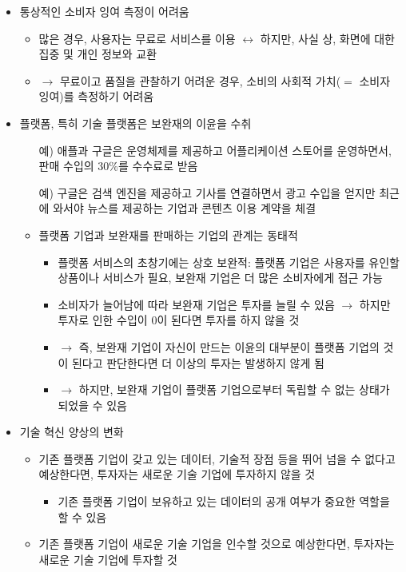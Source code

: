 \begin{itemize}
\item 통상적인 소비자 잉여 측정이 어려움
	\begin{itemize}
	\item 많은 경우, 사용자는 무료로 서비스를 이용 $\leftrightarrow$ 하지만, 사실 상, 화면에 대한 집중 및 개인 정보와 교환
	\item $\rightarrow$ 무료이고 품질을 관찰하기 어려운 경우, 소비의 사회적 가치($=$ 소비자 잉여)를 측정하기 어려움
	\end{itemize}
\item 플랫폼, 특히 기술 플랫폼은 보완재의 이윤을 수취
	\begin{itemize}
	\item[예)] 애플과 구글은 운영체제를 제공하고 어플리케이션 스토어를 운영하면서, 판매 수입의 30\%를 수수료로 받음
	\item[예)] 구글은 검색 엔진을 제공하고 기사를 연결하면서 광고 수입을 얻지만 최근에 와서야 뉴스를 제공하는 기업과 콘텐츠 이용 계약을 체결
	\item 플랫폼 기업과 보완재를 판매하는 기업의 관계는 동태적
		\begin{itemize}
		\item 플랫폼 서비스의 초창기에는 상호 보완적: 플랫폼 기업은 사용자를 유인할 상품이나 서비스가 필요, 보완재 기업은 더 많은 소비자에게 접근 가능
		\item 소비자가 늘어남에 따라 보완재 기업은 투자를 늘릴 수 있음 $\rightarrow$ 하지만 투자로 인한 수입이 0이 된다면 투자를 하지 않을 것
		\item $\rightarrow$ 즉, 보완재 기업이 자신이 만드는 이윤의 대부분이 플랫폼 기업의 것이 된다고 판단한다면 더 이상의 투자는 발생하지 않게 됨
		\item $\rightarrow$ 하지만, 보완재 기업이 플랫폼 기업으로부터 독립할 수 없는 상태가 되었을 수 있음
		\end{itemize}
	\end{itemize}
\item 기술 혁신 양상의 변화
	\begin{itemize}
	\item 기존 플랫폼 기업이 갖고 있는 데이터, 기술적 장점 등을 뛰어 넘을 수 없다고 예상한다면, 투자자는 새로운 기술 기업에 투자하지 않을 것
		\begin{itemize}
		\item 기존 플랫폼 기업이 보유하고 있는 데이터의 공개 여부가 중요한 역할을 할 수 있음
		\end{itemize}
	\item 기존 플랫폼 기업이 새로운 기술 기업을 인수할 것으로 예상한다면, 투자자는 새로운 기술 기업에 투자할 것

\end{itemize}
\end{itemize}

